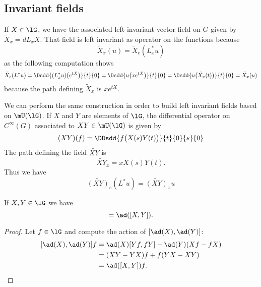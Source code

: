 \subsection{Invariant fields}

If $X\in\lG$, we have the associated left invariant vector field on $G$ given by $\tilde X_x=dL_xX$. That field is left invariant as operator on the functions because
\begin{equation}
    \tilde X_x(u)=\tilde X_e(L^*_xu)
\end{equation}
as the following computation shows
\begin{equation}
        \tilde X_e(L^*u)=\Dsdd{ (L_x^*u)\big(  e^{tX} \big) }{t}{0}
        =\Dsdd{ u\big( x e^{tX} \big) }{t}{0}
        =\Dsdd{ u\big( \tilde X_x(t) \big) }{t}{0}
        =\tilde X_x(u)
\end{equation}
because the path defining $\tilde X_x$ is $x e^{tX}$.

We can perform the same construction in order to build left invariant fields based on $\mU(\lG)$. If $X$ and $Y$ are elements of $\lG$, the  differential operator on $ C^{\infty}(G)$ associated to $XY\in\mU(\lG)$ is given by
\begin{equation}
    (XY)(f)=\DDsdd{ f\big( X(s)Y(t) \big) }{t}{0}{s}{0}
\end{equation}
The path defining the field $\widetilde{XY}$ is
\begin{equation}
    \widetilde{XY}_x=xX(s)Y(t).
\end{equation}
Thus we have
\begin{equation}        \label{EqInvarUgField}
    \widetilde{(XY)}_e(L^*u)=\widetilde{(XY)}_xu
\end{equation}

\begin{lemma}       \label{LemAdesthioo}
    If \( X,Y\in\lG\) we have
    \begin{equation}
        [\ad(X),\ad(Y)]=\ad([X,Y]).
    \end{equation}
\end{lemma}

\begin{proof}
    Let \( f\in\lG\) and compute the action of \( [\ad(X),\ad(Y)]\):
    \begin{subequations}
        \begin{align}
            [\ad(X),\ad(Y)]f&=\ad(X)[Yf,fY]-\ad(Y)(Xf-fX)\\
            &=(XY-YX)f+f(YX-XY)\\
            &=\ad([X,Y])f.
        \end{align}
    \end{subequations}
\end{proof}

